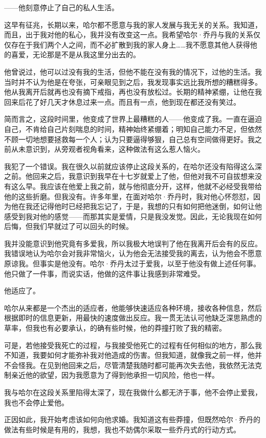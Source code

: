 \documentclass[../main]{subfiles}
\begin{document}
——他刻意停止了自己的私人生活。

这早有征兆，长期以来，哈尔都不愿意与我的家人发展与我无关的关系。我知道，而且，出于我对他的私心，我并没有改变这一点。我希望哈尔·乔丹与我的关系仅仅存在于我们两个人之间，而不必扩散到我的家人身上……我不愿意其他人获得他的喜爱，无论那是不是从我这里分出去的。

他曾说过，他可以过没有我的生活，但他不能在没有我的情况下，过他的生活。我当时并不认为他是在夸张，可亲眼见到之后，我发现事实远比我所想的糟糕得多。他从我离开后就再也没有摘下戒指，再也没有放松过。长期的精神紧绷，让他在我回来后花了好几天才休息过来一点。而且有一点，他到现在都还没有笑过。

简而言之，这段时间里，他变成了世界上最糟糕的人——他变成了我。一直在逼迫自己，不肯给自己片刻喘息的时间，精神始终紧绷着；明知自己能力不足，但依然不顾一切地想要拯救每一个人；认为只要逼得够狠，自己总有空间做得更好。我之前从未意识到，从旁观者视角看来，这种做法有这么惹人恼火。

我犯了一个错误。我在很久以前就应该停止这段关系的，在哈尔还没有陷得这么深之前。他回来之后，我意识到我早在十七岁就爱上了他，但他对我不可自拔想来没有这么早。我应该在他爱上我之前，就与他彻底分开，这样，他就不必经受我带给他的这些折磨。但我没有。许多年里，在面对哈尔·乔丹时，我对他心怀怨怼，因为他在我还记得他时已经把我忘记了，于是，我想的只有如何把他迷倒，如何让他感受到我对他的感觉——而那其实是爱情，只是我没发觉。因此，无论我现在如何后悔，但我们早就过了可以回头的时候。

我并没能意识到他究竟有多爱我，所以我极大地误判了他在我离开后会有的反应。我错误地认为哈尔会对我非常恼火，认为他会无法接受我的离去，认为他会不愿意原谅我。但事实是他没有。哈尔·乔丹太过于爱我，以至于他没有做上述任何事。他只做了一件事，而说实话，他做的这件事让我感到非常难受。

他适应了。

哈尔从来都是一个杰出的适应者，他能够快速适应各种环境，接收各种信息，然后根据即时的信息更新，用最快的速度做出反应。我一贯无法认可他缺乏深思熟虑的草率，但我也有必要承认，的确有些时候，他的莽撞打败了我的精密。

可是，若他接受我死亡的过程，与我接受他死亡的过程有任何相似的地方，那么我不知道，我要如何才能弥补我对他造成的伤害。但我知道，就像我之前一样，他并不会怪我。在见到他回来之后，尽管清楚我随时都可能再次失去他，我依然无法克制亲近他的欲望，因为我愿意为了得到他承担一切风险，他也一样。

我与哈尔在这段关系里陷得太深了，现在我做什么都无济于事，他不会停止爱我，我也不会停止爱他。

正因如此，我开始考虑该如何向他求婚。我知道这有些莽撞，但既然哈尔·乔丹的做法有些时候是有用的，我想，我也不妨偶尔采取一些乔丹式的行动方式。
\end{document}
